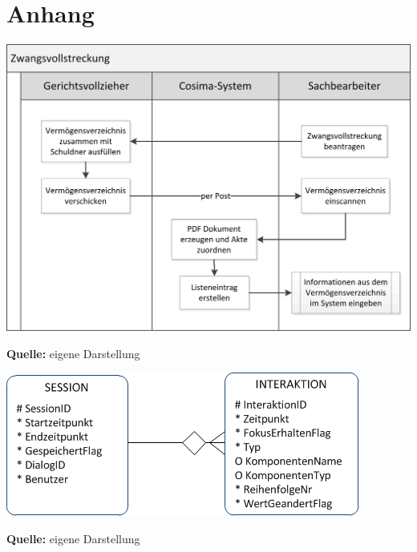 \section*{Anhang}

\anhangsverzeichnis

\label{sec:ablaufZwangsvollstreckung}
\begin{minipage}{\textwidth}
  \centering
  \includegraphics{img/Zwangsvollstreckung_Prozess.png}
  \caption*{\textbf{Quelle:} eigene Darstellung}
  \label{fig:zwangsvollstreckungProzess}
\end{minipage}

\label{sec:ermUIDataCollector}
\begin{minipage}{\textwidth}
  \centering
  \includegraphics[scale=0.9]{img/ERM_UIDataCollector.PNG}
  \caption*{\textbf{Quelle:} eigene Darstellung}
  \label{fig:ermUIDataCollector}
\end{minipage}

